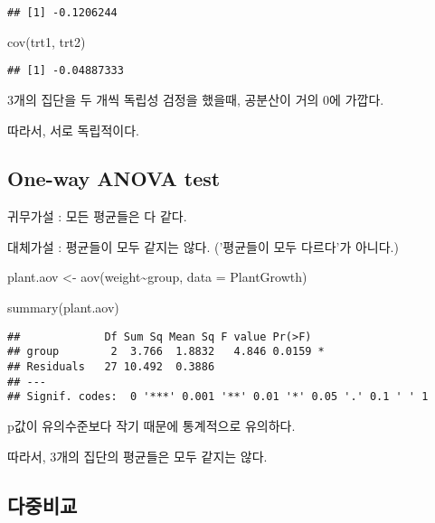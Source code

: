 \documentclass[
]{article}
\newenvironment{Shaded}{\begin{snugshade}}{\end{snugshade}}
\newcommand{\AttributeTok}[1]{\textcolor[rgb]{0.77,0.63,0.00}{#1}}
\newcommand{\FunctionTok}[1]{\textcolor[rgb]{0.00,0.00,0.00}{#1}}
\newcommand{\NormalTok}[1]{#1}
\newcommand{\OtherTok}[1]{\textcolor[rgb]{0.56,0.35,0.01}{#1}}
\newcommand{\SpecialCharTok}[1]{\textcolor[rgb]{0.00,0.00,0.00}{#1}}
\begin{document}
\begin{verbatim}
## [1] -0.1206244
\end{verbatim}

\begin{Shaded}
\begin{Highlighting}[]
\FunctionTok{cov}\NormalTok{(trt1, trt2)}
\end{Highlighting}
\end{Shaded}

\begin{verbatim}
## [1] -0.04887333
\end{verbatim}

3개의 집단을 두 개씩 독립성 검정을 했을때, 공분산이 거의 0에 가깝다.

따라서, 서로 독립적이다.

\hypertarget{one-way-anova-test}{%
\subsection{One-way ANOVA test}\label{one-way-anova-test}}

귀무가설 : 모든 평균들은 다 같다.

대체가설 : 평균들이 모두 같지는 않다. ('평균들이 모두 다르다'가 아니다.)

\begin{Shaded}
\begin{Highlighting}[]
\NormalTok{plant.aov }\OtherTok{\textless{}{-}} \FunctionTok{aov}\NormalTok{(weight}\SpecialCharTok{\textasciitilde{}}\NormalTok{group, }\AttributeTok{data =}\NormalTok{ PlantGrowth)}

\FunctionTok{summary}\NormalTok{(plant.aov)}
\end{Highlighting}
\end{Shaded}

\begin{verbatim}
##             Df Sum Sq Mean Sq F value Pr(>F)  
## group        2  3.766  1.8832   4.846 0.0159 *
## Residuals   27 10.492  0.3886                 
## ---
## Signif. codes:  0 '***' 0.001 '**' 0.01 '*' 0.05 '.' 0.1 ' ' 1
\end{verbatim}

p값이 유의수준보다 작기 때문에 통계적으로 유의하다.

따라서, 3개의 집단의 평균들은 모두 같지는 않다.

\hypertarget{uxb2e4uxc911uxbe44uxad50}{%
\subsection{다중비교}\label{uxb2e4uxc911uxbe44uxad50}}
\end{document}
